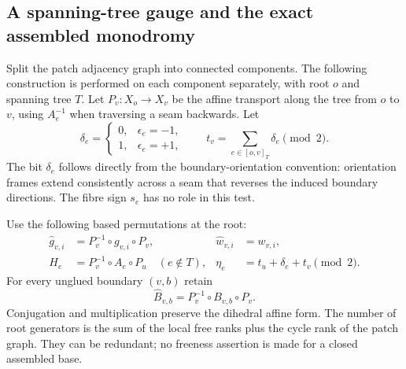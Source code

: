 \subsection{A spanning-tree gauge and the exact assembled monodromy}

Split the patch adjacency graph into connected components.  The following
construction is performed on each component separately, with root $o$ and
spanning tree $T$.  Let $P_v:X_o\to X_v$ be the affine transport along
the tree from $o$ to $v$, using $A_e^{-1}$ when traversing a seam backwards.
Let
\[
 \delta_e=\begin{cases}0,&\epsilon_e=-1,\\1,&\epsilon_e=+1,\end{cases}
 \qquad
 t_v=\sum_{e\in[o,v]_T}\delta_e\pmod2.
\]
The bit $\delta_e$ follows directly from the boundary-orientation convention:
orientation frames extend consistently across a seam that reverses the
induced boundary directions.  The fibre sign $s_e$ has no role in this test.

Use the following based permutations at the root:
\begin{align*}
 \widehat g_{v,i}&=P_v^{-1}\circ g_{v,i}\circ P_v,
       &\widehat w_{v,i}&=w_{v,i},\\
 H_e&=P_v^{-1}\circ A_e\circ P_u\quad(e\notin T),
       &\eta_e&=t_u+\delta_e+t_v\pmod2.
\end{align*}
For every unglued boundary $(v,b)$ retain
\[
 \widehat B_{v,b}=P_v^{-1}\circ B_{v,b}\circ P_v.
\]
Conjugation and multiplication preserve the dihedral affine form.  The
number of root generators is the sum of the local free ranks plus the
cycle rank of the patch graph.  They can be redundant; no freeness assertion
is made for a closed assembled base.

